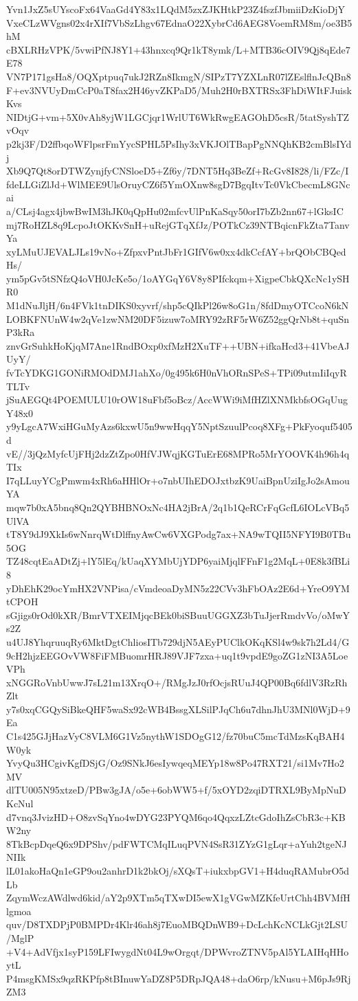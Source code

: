 Yvn1JxZ5sUYscoFx64VaaGd4Y83x1LQdM5zxZJKHtkP23Z4fszfJbmiiDzKioDjY
VxeCLzWVgns02x4rXIf7VbSzLhgv67EdnaO22XybrCd6AEG8VoemRM8m/oe3B5hM
cBXLRHzVPK/5vwiPfNJ8Y1+43hnxcq9Qr1kT8ymk/L+MTB36cOIV9Qj8qEde7E78
VN7P171gsHa8/OQXptpuq7ukJ2RZn8IkmgN/SIPzT7YZXLnR07lZEslflnJcQBn8
F+ev3NVUyDmCcP0aT8fax2H46yvZKPaD5/Muh2H0rBXTRSx3FhDiWItFJuiskKvs
NIDtjG+vm+5X0vAh8yjW1LGCjqr1WrlUT6WkRwgEAGOhD5csR/5tatSyshTZvOqv
p2kj3F/D2ffbqoWFlpsrFmYycSPHL5PsIhy3xVKJOlTBapPgNNQhKB2cmBlsIYdj
Xb9Q7Qt8orDTWZynjfyCNSloeD5+Zf6y/7DNT5Hq3BeZf+RcGv8I828/li/FZc/I
fdeLLGiZlJd+WlMEE9UlsOruyCZ6f5YmOXnw8sgD7BgqItvTc0VkCbecmL8GNcai
a/CLsj4agx4jbwBwIM3hJK0qQpHu02mfcvUlPnKaSqy50orI7bZb2nn67+lGksIC
mj7RoHZL8q9LcpoJtOKKvSnH+uRejGTqXfJz/POTkCz39NTBqicnFkZta7TanvYa
xyLMuUJEVALJLs19vNo+ZfpxvPntJbFr1GIfV6w0xx4dkCcfAY+brQObCBQedHs/
ym5pGv5tSNfzQ4oVH0JcKe5o/1oAYGqY6V8y8PIfckqm+XigpeCbkQXcNc1ySHR0
M1dNuJljH/6n4FVk1tnDIKS0xyvrf/shp5cQIkPl26w8oG1n/8fdDmyOTCcoN6kN
LOBKFNUnW4w2qVe1zwNM20DF5izuw7oMRY92zRF5rW6Z52ggQrNb8t+quSnP3kRa
znvGrSuhkHoKjqM7Ane1RndBOxp0xfMzH2XuTF++UBN+ifkaHcd3+41VbeAJUyY/
fvTcYDKG1GONiRMOdDMJ1ahXo/0g495k6H0nVhORnSPeS+TPi09utmIiIqyRTLTv
jSuAEGQt4POEMULU10rOW18uFbf5oBcz/AccWWi9iMfHZlXNMkbfsOGqUugY48x0
y9yLgcA7WxiHGuMyAzs6kxwU5n9wwHqqY5NptSzuulPcoq8XFg+PkFyoquf5405d
vE//3jQzMyfcUjFHj2dzZtZpo0HfVJWqjKGTuErE68MPRo5MrYOOVK4h96h4qTIx
I7qLLuyYCgPmwm4xRh6aHHlOr+o7nbUIhEDOJxtbzK9UaiBpnUziIgJo2sAmouYA
mqw7b0xA5bnq8Qn2QYBHBNOxNc4HA2jBrA/2q1b1QeRCrFqGcfL6IOLcVBq5UlVA
tT8Y9dJ9XkIs6wNnrqWtDlffnyAwCw6VXGPodg7ax+NA9wTQII5NFYI9B0TBu5OG
TZ48cqtEaADtZj+lY5lEq/kUaqXYMbUjYDP6yaiMjqlFFnF1g2MqL+0E8k3fBLi8
yDhEhK29ocYmHX2VNPisa/cVmdeoaDyMN5z22CVv3hFbOAz2E6d+YreO9YMtCPOH
sGjigs0rOd0kXR/BmrVTXEIMjqcBEk0biSBuuUGGXZ3bTuJjerRmdvVo/oMwYs2Z
u4UJ8YhqruuqRy6MktDgtChliosITb729djN5AEyPUClkOKqKSl4w9sk7h2Ld4/G
9cH2hjzEEGOvVW8FiFMBuomrHRJ89VJF7zxa+uq1t9vpdE9goZG1zNI3A5LoeVPh
xNGGRoVnbUwwJ7sL21m13XrqO+/RMgJzJ0rfOcjsRUuJ4QP00Bq6fdlV3RzRhZlt
y7s0xqCGQySiBkeQHF5waSx92cWB4BssgXLSilPJqCh6u7dhnJhU3MNl0WjD+9Ea
C1s425GJjHazVyC8VLM6G1Vz5nythW1SDOgG12/fz70buC5mcTdMzsKqBAH4W0yk
YvyQu3HCgivKgfDSjG/Oz9SNkJ6esIywqeqMEYp18w8Po47RXT21/si1Mv7Ho2MV
dlTU005N95xtzeD/PBw3gJA/o5e+6obWW5+f/5xOYD2zqiDTRXL9ByMpNuDKcNul
d7vnq3JvizHD+O8zvSqYno4wDYG23PYQM6qo4QqxzLZtcGdoIhZsCbR3c+KBW2ny
8TkBcpDqeQ6x9DPShv/pdFWTCMqILuqPVN4SsR31ZYzG1gLqr+aYuh2tgeNJNIIk
lL01akoHaQn1eGP9ou2anhrD1k2bkOj/sXQsT+iukxbpGV1+H4duqRAMubrO5dLb
ZqymWczAWdlwd6kid/aY2p9XTm5qTXwDI5ewX1gVGwMZKfeUrtChh4BVMfHlgmoa
quv/D8TXDPjP0BMPDr4Klr46ah8j7EuoMBQDnWB9+DcLchKcNCLkGjt2LSU/MglP
+V4+AdVfjx1syP159LFIwygdNt04L9wOrgqt/DPWvroZTNV5pAl5YLAIHqHHoytL
P4msgKMSx9qzRKPfp8tBInuwYaDZ8P5DRpJQA48+daO6rp/kNusu+M6pJs9RjZM3
